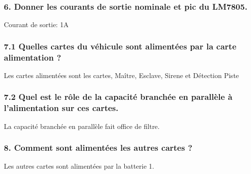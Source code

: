 \documentclass[french,a4paper,,tablecaptionabove]{scrartcl}
\begin{document}
\hypertarget{donner-les-courants-de-sortie-nominale-et-pic-du-lm7805.}{%
\subsubsection{6. Donner les courants de sortie nominale et pic du
LM7805.}\label{donner-les-courants-de-sortie-nominale-et-pic-du-lm7805.}}

Courant de sortie: 1A

\pagebreak

\hypertarget{quelles-cartes-du-vuxe9hicule-sont-alimentuxe9es-par-la-carte-alimentation}{%
\subsubsection{7.1 Quelles cartes du véhicule sont alimentées par la
carte alimentation
?}\label{quelles-cartes-du-vuxe9hicule-sont-alimentuxe9es-par-la-carte-alimentation}}

Les cartes alimentées sont les cartes, Maître, Esclave, Sirene et
Détection Piste

\hypertarget{quel-est-le-ruxf4le-de-la-capacituxe9-branchuxe9e-en-paralluxe8le-uxe0-lalimentation-sur-ces-cartes.}{%
\subsubsection{7.2 Quel est le rôle de la capacité branchée en parallèle
à l'alimentation sur ces
cartes.}\label{quel-est-le-ruxf4le-de-la-capacituxe9-branchuxe9e-en-paralluxe8le-uxe0-lalimentation-sur-ces-cartes.}}

La capacité branchée en parallèle fait office de filtre.

\hypertarget{comment-sont-alimentuxe9es-les-autres-cartes}{%
\subsubsection{8. Comment sont alimentées les autres cartes
?}\label{comment-sont-alimentuxe9es-les-autres-cartes}}

Les autres cartes sont alimentées par la batterie 1.
\end{document}
